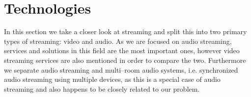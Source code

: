 






\section{Technologies}\label{sec:sota_technologies}
In this section we take a closer look at streaming and split this into two primary types of streaming: video and audio.
As we are focused on audio streaming, services and solutions in this field are the most important ones, however video streaming services are also mentioned in order to compare the two.
Furthermore we separate audio streaming and multi--room audio systems, i.e. synchronized audio streaming using multiple devices, as this is a special case of audio streaming and also happens to be closely related to our problem.

